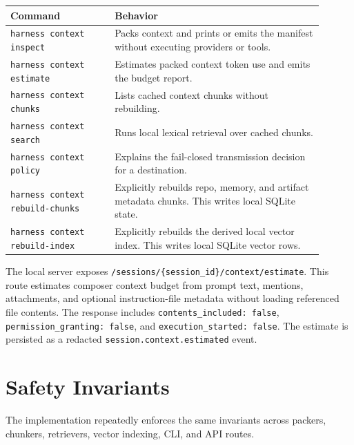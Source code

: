 \documentclass[11pt]{article}
\begin{document}
\begin{longtable}{p{0.30\linewidth}p{0.60\linewidth}}
\toprule
\textbf{Command} & \textbf{Behavior} \\
\midrule
\texttt{harness context inspect} & Packs context and prints or emits the manifest without executing providers or tools. \\
\texttt{harness context estimate} & Estimates packed context token use and emits the budget report. \\
\texttt{harness context chunks} & Lists cached context chunks without rebuilding. \\
\texttt{harness context search} & Runs local lexical retrieval over cached chunks. \\
\texttt{harness context policy} & Explains the fail-closed transmission decision for a destination. \\
\texttt{harness context rebuild-chunks} & Explicitly rebuilds repo, memory, and artifact metadata chunks. This writes local SQLite state. \\
\texttt{harness context rebuild-index} & Explicitly rebuilds the derived local vector index. This writes local SQLite vector rows. \\
\bottomrule
\end{longtable}

The local server exposes \texttt{/sessions/\{session\_id\}/context/estimate}. This route estimates composer context budget from prompt text, mentions, attachments, and optional instruction-file metadata without loading referenced file contents. The response includes \texttt{contents\_included: false}, \texttt{permission\_granting: false}, and \texttt{execution\_started: false}. The estimate is persisted as a redacted \texttt{session.context.estimated} event.

\section{Safety Invariants}

The implementation repeatedly enforces the same invariants across packers, chunkers, retrievers, vector indexing, CLI, and API routes.
\end{document}

